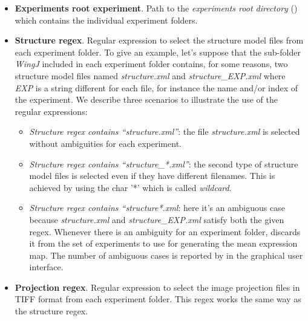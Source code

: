 \begin{itemize}
 \item \textbf{Experiments root experiment}. Path to the \textit{experiments root directory} () which contains the individual experiment folders.
 \item \textbf{Structure regex}. Regular expression to select the structure model files from each experiment folder. To give an example, let's suppose that the sub-folder \textit{WingJ} included in each experiment folder contains, for some reasons, two structure model files named \textit{structure.xml} and \textit{structure\_EXP.xml} where \textit{EXP} is a string different for each file, for instance the name and/or index of the experiment. We describe three scenarios to illustrate the use of the regular expressions:
    \begin{itemize}
     \item \textit{Structure regex contains ``structure.xml''}: the file \textit{structure.xml} is selected without ambiguities for each experiment.
     \item \textit{Structure regex contains ``structure\_*.xml''}: the second type of structure model files is selected even if they have different filenames. This is achieved by using the char '*' which is called \textit{wildcard}.
     \item \textit{Structure regex contains ``structure*.xml}: here it's an ambiguous case because \textit{structure.xml} and \textit{structure\_EXP.xml} satisfy both the given regex. Whenever there is an ambiguity for an experiment folder, \wingj discards it from the set of experiments to use for generating the mean expression map. The number of ambiguous cases is reported by \wingj in the graphical user interface.
    \end{itemize}
 \item \textbf{Projection regex}. Regular expression to select the image projection files in TIFF format from each experiment folder. This regex works the same way as the structure regex.
\end{itemize}


